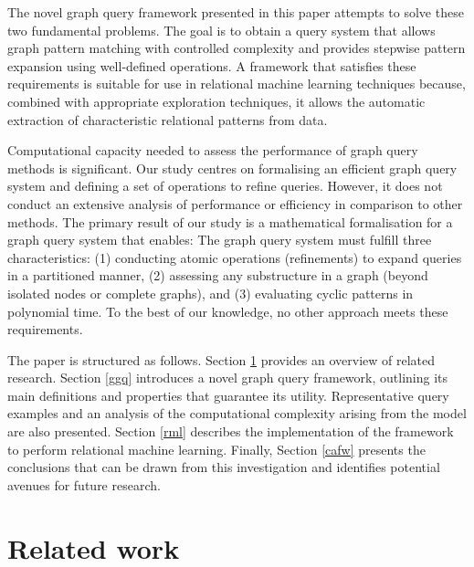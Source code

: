 \documentclass[mathematics,article,submit,pdftex,moreauthors]{Definitions/mdpi}
\begin{document}
The novel graph query framework presented in this paper attempts to solve these two fundamental problems. The goal is to obtain a query system that allows graph pattern matching with controlled complexity and provides stepwise pattern expansion using well-defined operations. A framework that satisfies these requirements is suitable for use in relational machine learning techniques because, combined with appropriate exploration techniques, it allows the automatic extraction of characteristic relational patterns from data. 

Computational capacity needed to assess the performance of graph query methods is significant. Our study centres on formalising an efficient graph query system and defining a set of operations to refine queries. However, it does not conduct an extensive analysis of performance or efficiency in comparison to other methods. The primary result of our study is a mathematical formalisation for a graph query system that enables: The graph query system must fulfill three characteristics: (1) conducting atomic operations (refinements) to expand queries in a partitioned manner, (2) assessing any substructure in a graph (beyond isolated nodes or complete graphs), and (3) evaluating cyclic patterns in polynomial time. To the best of our knowledge, no other approach meets these requirements.

The paper is structured as follows. Section \ref{rw} provides an overview of related research. Section \ref{ggq} introduces a novel graph query framework, outlining its main definitions and properties that guarantee its utility. Representative query examples and an analysis of the computational complexity arising from the model are also presented. Section \ref{rml} describes the implementation of the framework to perform relational machine learning. Finally, Section \ref{cafw} presents the conclusions that can be drawn from this investigation and identifies potential avenues for future research. 

\section{Related work}
\label{rw}
\end{document}
